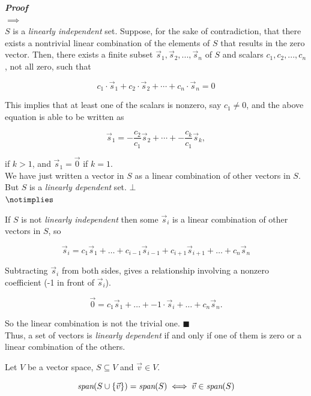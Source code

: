\textbf{\textit{Proof}}\\
$\implies$
\\
$S$ is a \textit{linearly independent} set. Suppose, for the sake of contradiction, that there exists a nontrivial linear combination of the elements of $S$ that results in the zero vector. Then, there exists a finite subset ${\vec s_1, \vec s_2,..., \vec s_n}$ of $S$ and scalars $c_1,c_2,...,c_n$, not all zero, such that

$$
c_1 \cdot \vec s_1 + c_2 \cdot \vec s_2 + \cdots + c_n \cdot \vec s_n = 0
$$

This implies that at least one of the scalars is nonzero, say $c_1 \neq 0$, and the above equation is able to be written as

$$\vec{s}_1 = -\frac{c_2}{c_1} \vec{s}_2 + \cdots + -\frac{c_k}{c_1} \vec{s}_k,$$

if $k > 1$, and $\vec{s}_1 = \vec{0}$ if $k = 1$.
\\

We have just written a vector in $S$ as a linear combination of other vectors in $S$. But $S$ is a \textit{linearly dependent} set. $\bot$\\

$\notimplies$

If $S$ is not \textit{linearly independent} then some $\vec s_i$ is a linear combination of other vectors in $S$, so 

$$
\vec s_i = c_1 \vec s_1 + \dots + c_{i-1} \vec s_{i-1} + c_{i+1} \vec s_{i+1} + \dots + c_{n} \vec s_n
$$

Subtracting $\vec s_i$ from both sides, gives a relationship involving a nonzero coefficient (-1 in front of $\vec s_i$).

$$
\vec 0 = c_1 \vec s_1 + \dots + -1 \cdot \vec s_i + \dots + c_{n} \vec s_n.
$$

So the linear combination is not the trivial one. $\blacksquare$
\\

Thus, a set of vectors is \emph{linearly dependent} if and only if one of them is zero or a linear combination of the others.

\begin{lemma}
    Let $V$ be a vector space, $S \subseteq V$ and $\vec v \in V$. 
    
    $$\textit{span}{\normalfont (S \cup \{\vec v\}) = \textit{span}(S)} \iff \vec v \in \textit{span}{\normalfont (S)}
    $$
\end{lemma}



